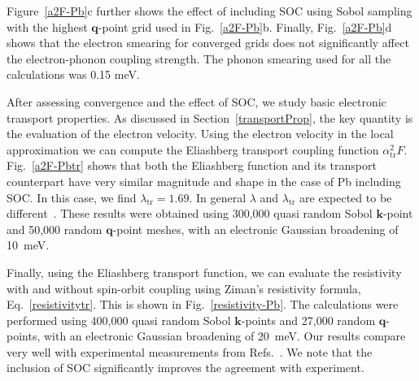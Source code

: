 \documentclass[final,3p,times,twocolumn]{elsarticle}
\begin{document}
Figure~\ref{a2F-Pb}c further shows the effect of including SOC using Sobol sampling with the highest $\mathbf{q}$-point grid used in Fig.~\ref{a2F-Pb}b. Finally, Fig.~\ref{a2F-Pb}d shows that the electron smearing for converged grids does not significantly affect the electron-phonon coupling strength. The phonon smearing used for all the calculations was 0.15 meV.    

After assessing convergence and the effect of SOC, we study basic electronic transport properties. As discussed in Section~\ref{transportProp}, the key quantity is the evaluation of the electron velocity.  
Using the electron velocity in the local approximation we can compute the Eliashberg transport coupling function $\alpha_{\text{tr}}^2F$.  
Fig.~\ref{a2F-Pbtr} shows that 
both the Eliashberg function and its transport counterpart have very similar magnitude and shape in the case of Pb including SOC.
In this case, we find $\lambda_{\text{tr}}=1.69$.
In general $\lambda$ and $\lambda_{\text{tr}}$ are expected to be different~\cite{Grimvall1981}.
These results were obtained using 300,000 quasi random Sobol $\mathbf{k}$-point and 50,000 random $\mathbf{q}$-point meshes, with an electronic Gaussian broadening of 10~meV.




Finally, using the Eliashberg transport function, we can evaluate the resistivity with and without spin-orbit coupling using Ziman's resistivity formula, Eq.~\eqref{resistivitytr}. This is shown in Fig.~\ref{resistivity-Pb}. The calculations were performed using 400,000 quasi random Sobol $\mathbf{k}$-points and 27,000 random $\mathbf{q}$-points, with an electronic Gaussian broadening of 20~meV. Our results compare very well with experimental measurements from Refs.~\cite{Leadbetter1966,Moore1973,Cook1974,Hellwege1983}. 
We note that the inclusion of SOC significantly improves the agreement with experiment. 
\end{document}
